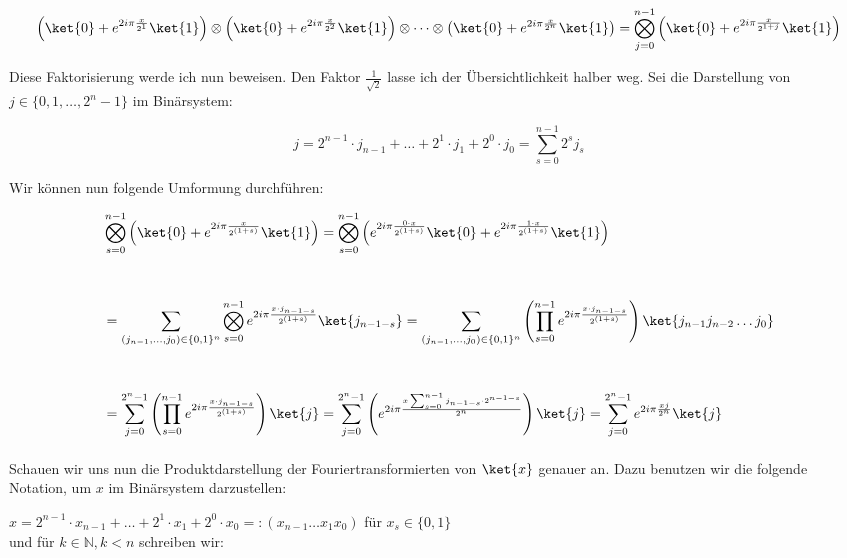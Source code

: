 \begin{align*}
    \left(\ket{0} + e^{2i\pi\frac{x}{2^{1}}}\ket{1}\right)\otimes\left(\ket{0} + e^{2i\pi\frac{x}{2^{2}}}\ket{1}\right)\otimes\cdots\otimes\left(\ket{0} + e^{2i\pi\frac{x}{2^{n}}}\ket{1}\right) = \bigotimes_{j = 0}^{n - 1}\left(\ket{0} + e^{2i\pi\frac{x}{2^{1 + j}}}\ket{1}\right)
\end{align*}

\noindent Diese Faktorisierung werde ich nun beweisen. Den Faktor $\frac{1}{\sqrt{2}}$ lasse ich der Übersichtlichkeit halber weg. Sei die Darstellung von $j \in \{0, 1, \dots, 2^n - 1\}$ im Binärsystem:

$$j=2^{n-1}\cdot j_{n-1}+\ldots + 2^1\cdot j_1+2^0\cdot j_0 = \sum_{s = 0}^{n - 1}2^sj_s$$

\noindent Wir können nun folgende Umformung durchführen:

\begin{align*}
&\bigotimes_{s = 0}^{n - 1}{\left( \ket{0} + e^{2i\pi\frac{x}{2^{(1 + s)}}}\ket{1} \right)} = \bigotimes_{s = 0}^{n - 1}{\left( e^{2i\pi\frac{0\cdot x}{2^{(1 + s)}}}\ket{0} + e^{2i\pi\frac{1 \cdot x}{2^{(1 + s)}}}\ket{1} \right)} \\[1cm] &= \sum_{(j_{n-1},\dots,j_0)\in \{0, 1\}^n}\bigotimes_{s = 0}^{n - 1}e^{2i\pi\frac{x\cdot j_{n - 1 - s}}{2^{(1 + s)}}}\ket{j_{n - 1 - s}} = \sum_{(j_{n-1},\dots,j_0)\in \{0, 1\}^n}\left( \prod_{s = 0}^{n - 1}e^{2i\pi\frac{x\cdot j_{n - 1 - s}}{2^{(1 + s)}}} \right)\ket{j_{n - 1}j_{n - 2}\dots j_0} \\[1cm] &= \sum_{j = 0}^{2^n - 1} \left( \prod_{s = 0}^{n - 1}e^{2i\pi\frac{x\cdot j_{n - 1 - s}}{2^{(1 + s)}}} \right) \ket{j} = \sum_{j = 0}^{2^n - 1}\left( e^{2i\pi\frac{x\sum_{s = 0}^{n - 1}{j_{n - 1 - s}\cdot 2^{n - 1 - s}}}{2^n}} \right)\ket{j} = \sum_{j = 0}^{2^n - 1}e^{2i\pi\frac{xj}{2^n}}\ket{j}
\end{align*}
\paragraph{}

\noindent Schauen wir uns nun die Produktdarstellung der Fouriertransformierten von $\ket{x}$ genauer an. Dazu benutzen wir die folgende Notation, um $x$ im Binärsystem darzustellen:

$x = 2^{n - 1}\cdot x_{n - 1} + \dots + 2^1 \cdot x_1 + 2^0 \cdot x_0 =: (x_{n - 1}\dots x_1x_0)$ \quad für $x_s \in \{0, 1\}$ \\
und für $k \in \mathbb{N}, k < n$ schreiben wir:

